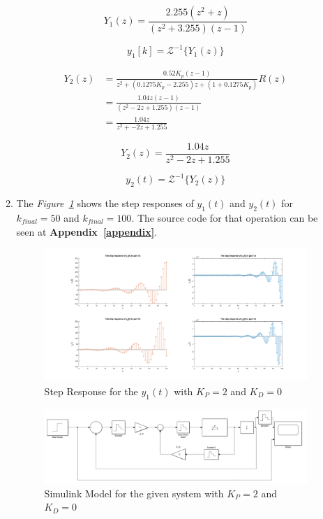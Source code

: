 \documentclass[a4paper,12pt]{article}
\begin{document}
\begin{enumerate}
\begin{enumerate}
 		$$\boxed{Y_1(z) =   \frac{2.255(z^2+z)}{(z^2+3.255)(z-1)}  }  $$	
 		
		$$\boxed{  y_1[k] = \mathcal{Z}^{-1} \{Y_1(z)	\} } $$
		
 		
 		\begin{equation*}
 		\begin{split}
 		Y_2(z) &=   \frac{0.52 K_p(z-1 )}{z^2+(0.1275K_p-2.255)z+(1+0.1275K_p) }R(z) \\	
 		&=  \frac{1.04z(z-1)}{(z^2-2z+1.255)(z-1)} \\ 
 		&= \frac{1.04z}{z^2+-2z+1.255}
 		\end{split}
 		\end{equation*}
 		
 		$$\boxed{Y_2(z) =   \frac{1.04z}{z^2-2z+1.255} }  $$
 		
 		
 				
 		$$\boxed{ y_2(t) = \mathcal{Z}^{-1} \{Y_2(z)	\} }$$
 		
 		
 		\item The \textit{Figure\ \ref{fig:stepy1a}} shows the step responses of $y_1(t)$ and $y_2(t)$ for $k_{final}=50$ and $k_{final}=100$.  The source code for that operation can be seen at \textbf{Appendix~\ref{appendix}}.
 		
 		
 			
 			\begin{figure}[H]
 				\center
 				\setlength{\unitlength}{\textwidth} 
 				\includegraphics[width=1.0\unitlength]{images/1d}
 				\caption{\label{fig:stepy1a} Step Response for the $y_1(t)$ with $K_P=2$ and $K_D=0$}
 			\end{figure}
 		
 		
 			\begin{figure}[H]
 				\center
 				\setlength{\unitlength}{\textwidth} 
 				\includegraphics[width=1.0\unitlength]{images/simu3}
 				\caption{\label{fig:simu1} Simulink Model for the given system with $K_P=2$ and $K_D=0$}
 			\end{figure}
 		

\end{enumerate}
\end{enumerate}
\end{document}
